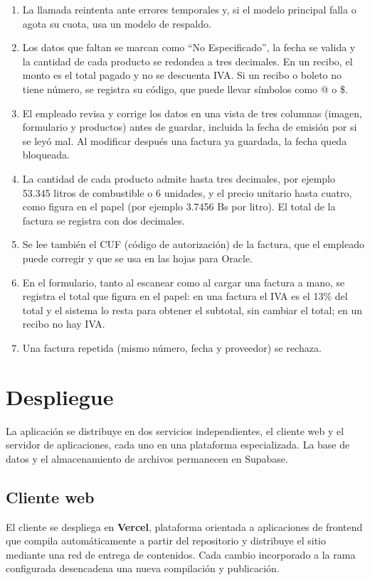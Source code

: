 \documentclass[11pt,letterpaper]{article}
\begin{document}
\begin{enumerate}
  \item La llamada reintenta ante errores temporales y, si el modelo principal falla o agota su cuota, usa un modelo de respaldo.
  \item Los datos que faltan se marcan como ``No Especificado'', la fecha se valida y la cantidad de cada producto se redondea a tres decimales. En un recibo, el monto es el total pagado y no se descuenta IVA. Si un recibo o boleto no tiene número, se registra su código, que puede llevar símbolos como @ o \$.
  \item El empleado revisa y corrige los datos en una vista de tres columnas (imagen, formulario y productos) antes de guardar, incluida la fecha de emisión por si se leyó mal. Al modificar después una factura ya guardada, la fecha queda bloqueada.
  \item La cantidad de cada producto admite hasta tres decimales, por ejemplo 53.345 litros de combustible o 6 unidades, y el precio unitario hasta cuatro, como figura en el papel (por ejemplo 3.7456 Bs por litro). El total de la factura se registra con dos decimales.
  \item Se lee también el CUF (código de autorización) de la factura, que el empleado puede corregir y que se usa en las hojas para Oracle.
  \item En el formulario, tanto al escanear como al cargar una factura a mano, se registra el total que figura en el papel: en una factura el IVA es el 13\% del total y el sistema lo resta para obtener el subtotal, sin cambiar el total; en un recibo no hay IVA.
  \item Una factura repetida (mismo número, fecha y proveedor) se rechaza.
\end{enumerate}

\section{Despliegue}
La aplicación se distribuye en dos servicios independientes, el cliente web y el servidor de aplicaciones, cada uno en una plataforma especializada. La base de datos y el almacenamiento de archivos permanecen en Supabase.

\subsection{Cliente web}
El cliente se despliega en \textbf{Vercel}, plataforma orientada a aplicaciones de frontend que compila automáticamente a partir del repositorio y distribuye el sitio mediante una red de entrega de contenidos. Cada cambio incorporado a la rama configurada desencadena una nueva compilación y publicación.
\end{document}
